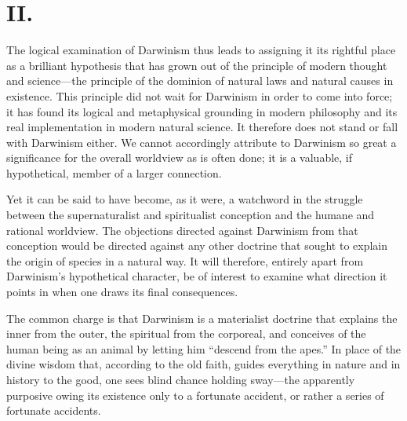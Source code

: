 \documentclass[12pt,a4paper]{article}
\begin{document}
\section*{II.}

The logical examination of Darwinism thus leads to assigning it its
rightful place as a brilliant hypothesis that has grown out of the
principle of modern thought and science---the principle of the
dominion of natural laws and natural causes in existence. This
principle did not wait for Darwinism in order to come into force; it
has found its logical and metaphysical grounding in modern philosophy
and its real implementation in modern natural science. It therefore
does not stand or fall with Darwinism either. We cannot accordingly
attribute to Darwinism so great a significance for the overall
worldview as is often done; it is a valuable, if hypothetical, member
of a larger connection.

Yet it can be said to have become, as it were, a watchword in the
struggle between the supernaturalist and spiritualist conception and
the humane and rational worldview. The objections directed against
Darwinism from that conception would be directed against any other
doctrine that sought to explain the origin of species in a natural
way. It will therefore, entirely apart from Darwinism's hypothetical
character, be of interest to examine what direction it points in when
one draws its final consequences.

The common charge is that Darwinism is a materialist doctrine that
explains the inner from the outer, the spiritual from the corporeal,
and conceives of the human being as an animal by letting him
``descend from the apes.'' In place of the divine wisdom that,
according to the old faith, guides everything in nature and in history
to the good, one sees blind chance holding sway---the apparently
purposive owing its existence only to a fortunate accident, or rather
a series of fortunate accidents.
\end{document}
